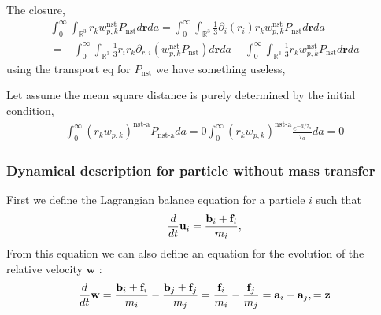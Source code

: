 The closure, 
\begin{align*}
    \int_0^\infty \int_{\mathbb{R}^3} 
    r_k w_{p,k}^\text{nst}P_\text{nst}
    d\textbf{r}da 
    =
    \int_0^\infty \int_{\mathbb{R}^3} 
    \frac{1}{3}\partial_i (r_i) r_k w_{p,k}^\text{nst}P_\text{nst}
    d\textbf{r}da \\
    = 
    - \int_0^\infty \int_{\mathbb{R}^3} 
    \frac{1}{3} r_i r_k \partial_{r,i} ( w_{p,k}^\text{nst}P_\text{nst})
    d\textbf{r}da 
    - \int_0^\infty \int_{\mathbb{R}^3} 
    \frac{1}{3} r_k w_{p,k}^\text{nst}P_\text{nst}
    d\textbf{r}da 
\end{align*}
using the transport eq for $P_\text{nst}$ we have something useless, 

Let assume the mean square distance is purely determined by the initial condition, 
\begin{align*}
    \int_0^\infty 
    (r_k w_{p,k})^\text{nst-a}P_\text{nst-a}
    da 
    = 0 
    \int_0^\infty 
    (r_k w_{p,k})^\text{nst-a}\frac{e^{-a/\tau_a}}{\tau_a}
    da 
    = 0 
\end{align*}


\subsubsection{Dynamical description for particle without mass transfer}
First we define the Lagrangian balance equation for a particle $i$ such that 
\begin{equation}
    \ddt \textbf{u}_i
     = \frac{
        \textbf{b}_i
        + \textbf{f}_i
     }{m_i},
     \label{eq:dt_u_i}
 \end{equation}
From this equation we can also define an equation for the evolution of the relative velocity $\textbf{w}$ :
\begin{equation}
    \ddt \textbf{w}
    = \frac{
        \textbf{b}_i
        + \textbf{f}_i
    }{m_i}
    -\frac{
        \textbf{b}_j
        + \textbf{f}_j
    }{m_j}
    =\frac{
        \textbf{f}_i
    }{m_i}
    -\frac{
        \textbf{f}_j
    }{m_j}
    = 
    \textbf{a}_i
    - \textbf{a}_j,
    = \textbf{z}
    \label{eq:dt_w}
\end{equation}
